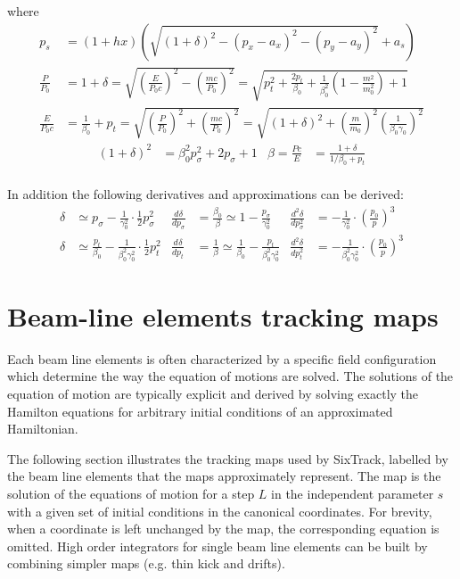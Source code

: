 \documentclass[english]{article}
\def\TnD#1#2#3{\frac{d^{#3} #1}{d #2^{#3}}}
\begin{document}
where
\begin{align}
  p_s&= (1+h x) \left(
    \sqrt{(1+\delta)^2 - (p_x-a_x )^2 - (p_y-a_y )^2} + a_s   \right) \\
  \frac{P}{P_0}&= 1+\delta =
  \sqrt{\left(\frac{E}{P_0c}\right)^2-\left(\frac{mc}{P_0}\right)^2}=
    \sqrt{p_t^2+\frac{2p_t}{\beta_0} +\frac{1}{\beta_0^2}
    \left(1-\frac{m^2}{m_0^2}\right)+1} \\
  \frac{E}{P_0c}&=
    \frac1{\beta_0}+p_t=
    \sqrt{\left(\frac{P}{P_0}\right)^2+\left(\frac{mc}{P_0}\right)^2}=
    \sqrt{\left(1+\delta\right)^2+ \left(\frac{m}{m_0}\right)^2
    \left(\frac1{\beta_0\gamma_0}\right)^2}
\end{align}
\begin{align}
  \left(1+\delta\right)^2 &=\beta_0^2p_{\sigma}^2+2p_{\sigma}+1 &
  \beta=\frac{Pc}E&=\frac{ 1+\delta}{1/{\beta_0}+p_t} \\
\end{align}

In addition the following derivatives and approximations can be derived:
\begin{align}
\delta &\simeq
      p_\sigma - \frac{1}{\gamma_0^2}\cdot\frac12 p_\sigma^2 &
\TnD{\delta}{p_\sigma}{}  &=
      \frac{\beta_0} \beta \simeq
      1- \frac{p_\sigma}{\gamma_0^2} &
\TnD{\delta}{p_\sigma}{2} &=
      -\frac{1}{\gamma_0^2} \cdot \left(\frac{p_0}{p}\right)^3 \\
\delta &\simeq
      \frac{p_t}{\beta_0} - \frac{1}{\beta_0^2\gamma_0^2}\cdot\frac12 p_t^2 &
\TnD{\delta}{p_t}{}  &=
      \frac{1}{\beta} \simeq
  \frac{1}{\beta_0}- \frac{p_t}{\beta_0^2\gamma_0^2} &
\TnD{\delta}{p_t}{2} &=
      -\frac{1}{\beta_0^2 \gamma_0^2} \cdot \left(\frac{p_0}{p}\right)^3 
\end{align}


\section{Beam-line elements tracking maps}
Each beam line elements is often characterized by a specific field
configuration which determine the way the equation of motions are solved. The
solutions of the equation of motion are typically explicit and derived by
solving exactly the Hamilton equations for arbitrary initial conditions of an
approximated Hamiltonian.

The following section illustrates the tracking maps used by SixTrack, labelled
by the beam line elements that the maps approximately represent. The map is the
solution of the equations of motion for a step $L$ in the independent parameter
$s$ with a given set of initial conditions in the canonical coordinates. For
brevity, when a coordinate is left unchanged by the map, the corresponding
equation is omitted.  High order integrators for single beam line elements can
be built by combining simpler maps (e.g. thin kick and drifts).
\end{document}

